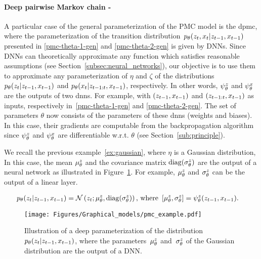 \paragraph{Deep pairwise Markov chain - }
\label{sec:dpmc}
A particular case of the general parameterization of the PMC model is the \gls*{dpmc},
where the parameterization of the transition distribution~$p_{\theta}(z_t,x_t|z_{t-1},x_{t-1})$
presented in \eqref{pmc-theta-1-gen} and \eqref{pmc-theta-2-gen} is given by DNNs.
Since DNNs can theoretically approximate any function which satisfies 
reasonable assumptions (see Section~\ref{subsec:neural_networks}),
our objective is to use them to
approximate any parameterization of $\eta$ and $\zeta$
of the distributions $p_{\theta}(z_t | z_{t-1}, x_{t-1})$
and  $p_{\theta}(x_t | z_{t-1:t}, x_{t-1})$, respectively.
In other words,  $\psi^{z}_{\theta}$ and $\psi^{x}_{\theta}$ are the outputs of two \gls*{dnns}. 
For example, with $(z_{t-1},x_{t-1})$
and $(z_{t-1:t},x_{t-1})$ as inputs, respectively in~\eqref{pmc-theta-1-gen} and \eqref{pmc-theta-2-gen}.
The set of parameters $\theta$ now consists of the parameters of these 
\gls*{dnns}  (weights and biases). 
In this case, their gradients are computable from the backpropagation
algorithm~\citep{rumelhart1985learning,hecht1992theory} since $\psi^{z}_{\theta}$ and $\psi^{x}_{\theta}$
are differentiable w.r.t. $\theta$ (see Section~\ref{sub:principle}).



\begin{example}
    \label{ex:dpmc_gaussian}

    We recall the previous example~\ref{ex:gaussian}, where $\eta$ is a Gaussian distribution,
    In this case, the mean $\mu_{\theta}^{z}$  and the covariance matrix 
    $\mathrm{diag}(\sigma_{\theta}^{z})$ are the
    output of a neural network as illustrated in Figure~\ref{fig:dpmc_gaussian}.
    For example, $\mu_{\theta}^{z}$ and $\sigma_{\theta}^{z}$ can be the output of a linear layer. 

    \begin{align*}
        p_{\theta}(z_t|z_{t-1},x_{t-1})  &= {\mathcal N}\left(z_t;  \mu_{\theta}^{z} , \mathrm{diag}(\sigma_{\theta}^{z}) \right)   \text{, where }   \left[ \mu_{\theta}^{z} , \sigma_{\theta}^{z} \right]= \psi^{z}_{\theta}(z_{t-1},x_{t-1}) \text{.} 
    \end{align*}
    
    \begin{figure}[htb]
        \centering
        \texttt{[image: Figures/Graphical\_models/pmc\_example.pdf]}
        \caption{Illustration of a deep parameterization of the
        distribution~$p_{\theta}(z_t|z_{t-1},x_{t-1})$, where the
        parameters~$\mu_{\theta}^{z}$ and~$\sigma_{\theta}^{z}$ of the Gaussian distribution
        are the output of a DNN.}
        \label{fig:dpmc_gaussian}
    \end{figure}
\end{example}

